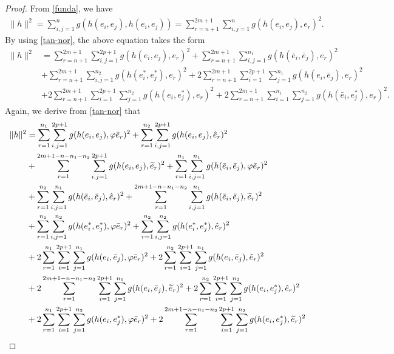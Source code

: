 \documentclass[reqno]{amsart}
\theoremstyle{plain}
\theoremstyle{remark}
\numberwithin{equation}{section}
\begin{document}
\begin{proof} From \eqref{funda}, we have
\begin{align*}
\|h\|^2=\sum_{i,j=1}^ng(h(e_i, e_j), h(e_i, e_j)) =\sum_{r=n+1}^{2m+1}\sum_{i,j=1}^ng(h(e_i, e_j), e_r)^2.\end{align*}
By using \eqref{tan-nor}, the above equation takes the form
\begin{align*}
\|h\|^2&=\sum_{r=n+1}^{2m+1}\sum_{i,j=1}^{2p+1}g(h(e_i, e_j), e_r)^2+\sum_{r=n+1}^{2m+1}\sum_{i,j=1}^{n_1}g(h(\bar e_i, \bar e_j), e_r)^2\\
&+\sum_{r=n+1}^{2m+1}\sum_{i,j=1}^{n_2}g(h(e_i^{*}, e_j^{*}), e_r)^2+2\sum_{r=n+1}^{2m+1}\sum_{i=1}^{2p+1}\sum_{j=1}^{n_1}g(h(e_i, \bar e_j), e_r)^2\\
&+2\sum_{r=n+1}^{2m+1}\sum_{i=1}^{2p+1}\sum_{j=1}^{n_2}g(h(e_i, e_j^{*}), e_r)^2+2\sum_{r=n+1}^{2m+1}\sum_{i=1}^{n_1}\sum_{j=1}^{n_2}g(h(\bar e_i,  e_j^{*}), e_r)^2.
\end{align*}
Again, we derive from \eqref{tan-nor} that
\begin{align}
\|h\|^2&=\sum_{r=1}^{n_1}\sum_{i,j=1}^{2p+1}g(h(e_i, e_j), \varphi \bar e_r)^2+\sum_{r=1}^{n_2}\sum_{i,j=1}^{2p+1}g(h(e_i, e_j), \hat{e}_r)^2\notag\\
&+\sum_{r=1}^{2m+1-n-n_1-n_2}\sum_{i,j=1}^{2p+1}g(h(e_i, e_j), \widetilde e_r)^2+\sum_{r=1}^{n_1}\sum_{i,j=1}^{n_1}g(h(\bar e_i, \bar e_j), \varphi \bar e_r)^2
\notag\\
&+\sum_{r=1}^{n_2}\sum_{i,j=1}^{n_1}g(h(\bar e_i, \bar e_j), \hat{e}_r)^2+\sum_{r=1}^{2m+1-n-n_1-n_2}\sum_{i,j=1}^{n_1}g(h(\bar e_i, \bar e_j), \widetilde {e}_r)^2\notag\\
&+\sum_{r=1}^{n_1}\sum_{i,j=1}^{n_2}g(h(e_i^{*}, e_j^{*}), \varphi \bar e_r)^2+\sum_{r=1}^{n_2}\sum_{i,j=1}^{n_2}g(h(e_i^{*}, e_j^{*}), \hat{e}_r)^2
\notag\\ \label{5.2}
&+2\sum_{r=1}^{n_1}\sum_{i=1}^{2p+1}\sum_{j=1}^{n_1}g(h(e_i, \bar e_j), \varphi \bar e_r)^2+2\sum_{r=1}^{n_2}\sum_{i=1}^{2p+1}\sum_{j=1}^{n_1}g(h(e_i, \bar e_j), \hat e_r)^2 
\\
&+2\sum_{r=1}^{2m+1-n-n_1-n_2}\sum_{i=1}^{2p+1}\sum_{j=1}^{n_1}g(h(e_i, \bar e_j), \widetilde e_r)^2+2\sum_{r=1}^{n_2}\sum_{i=1}^{2p+1}\sum_{j=1}^{n_2}g(h(e_i, e_j^{*}), \hat e_r)^2\notag
\\& \notag
+2\sum_{r=1}^{n_1}\sum_{i=1}^{2p+1}\sum_{j=1}^{n_2}g(h(e_i, e_j^{*}), \varphi\bar e_r)^2+2\sum_{r=1}^{2m+1-n-n_1-n_2}\sum_{i=1}^{2p+1}\sum_{j=1}^{n_2}g(h(e_i, e_j^{*}), \widetilde e_r)^2\notag\\

\end{align}
\end{proof}
\end{document}
